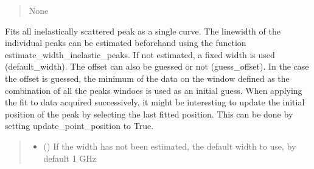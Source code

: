 \documentclass[letterpaper,10pt,english]{sphinxmanual}
\begin{document}
\begin{fulllineitems}
\begin{fulllineitems}
\begin{quote}
\begin{description}
\sphinxAtStartPar
None

\end{description}\end{quote}

\end{fulllineitems}


\begin{fulllineitems}
\label{\detokenize{source/_autosummary/HDF5_BLS_treat.Treat:HDF5_BLS_treat.Treat.multi_fit_all_inelastic}}
\pysigstartsignatures
\pysiglinewithargsret
{}
{\sphinxparamcomma {}\sphinxparamcomma {}\sphinxparamcomma {}\sphinxparamcomma {}}
{}
\pysigstopsignatures
\sphinxAtStartPar
Fits all inelastically scattered peak as a single curve. The linewidth of the individual peaks can be estimated beforehand using the function estimate\_width\_inelastic\_peaks. If not estimated, a fixed width is used (default\_width). The offset can also be guessed or not (guess\_offset). In the case the offset is guessed, the minimum of the data on the window defined as the combination of all the peaks windoes is used as an initial guess.
When applying the fit to data acquired successively, it might be interesting to update the initial position of the peak by selecting the last fitted position. This can be done by setting update\_point\_position to True.
\begin{quote}\begin{description}
\begin{itemize}
\item {} 
\sphinxAtStartPar
{} (\sphinxstyleliteralemphasis{\sphinxupquote{, }}) \textendash{} If the width has not been estimated, the default width to use, by default 1 GHz


\end{itemize}
\end{description}
\end{quote}
\end{fulllineitems}
\end{fulllineitems}
\end{document}
